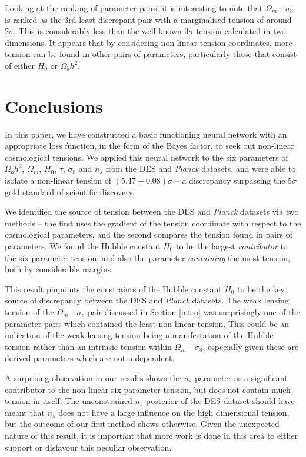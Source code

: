 \documentclass[%
 reprint,
 amsmath,amssymb,
 aps,
]{revtex4-2}
\begin{document}
Looking at the ranking of parameter pairs, it is interesting to note that $\Omega_m$ - $\sigma_8$ is ranked as the 3rd least discrepant pair with a marginalised tension of around $2\sigma$. This is considerably less than the well-known $3\sigma$ tension calculated in two dimensions. It appears that by considering non-linear tension coordinates, more tension can be found in other pairs of parameters, particularly those that consist of either $H_0$ or $\Omega_b h^2$.


\section{Conclusions}

In this paper, we have constructed a basic functioning neural network with an appropriate loss function, in the form of the Bayes factor, to seek out non-linear cosmological tensions. We applied this neural network to the six parameters of $\Omega_b h^2$, $\Omega_m$, $H_0$, $\tau$, $\sigma_8$ and $n_s$ from the DES and \textit{Planck} datasets, and were able to isolate a non-linear tension of $(5.47 \pm 0.08)\sigma$ -- a discrepancy surpassing the $5\sigma$ gold standard of scientific discovery.

We identified the source of tension between the DES and \textit{Planck} datasets via two methods -- the first uses the gradient of the tension coordinate with respect to the cosmological parameters, and the second compares the tension found in pairs of parameters. We found the Hubble constant $H_0$ to be the largest \textit{contributor} to the six-parameter tension, and also the parameter \textit{containing} the most tension, both by considerable margins. 

This result pinpoints the constraints of the Hubble constant $H_0$ to be the key source of discrepancy between the DES and \textit{Planck} datasets. The weak lensing tension of the $\Omega_m$ - $\sigma_8$ pair discussed in Section \ref{intro} was surprisingly one of the parameter pairs which contained the least non-linear tension. This could be an indication of the weak lensing tension being a manifestation of the Hubble tension rather than an intrinsic tension within $\Omega_m$ - $\sigma_8$, especially given these are derived parameters which are not independent.

A surprising observation in our results shows the $n_s$ parameter as a significant contributor to the non-linear six-parameter tension, but does not contain much tension in itself. The unconstrained $n_s$ posterior of the DES dataset should have meant that $n_s$ does not have a large influence on the high dimensional tension, but the outcome of our first method shows otherwise. Given the unexpected nature of this result, it is important that more work is done in this area to either support or disfavour this peculiar observation.
\end{document}
